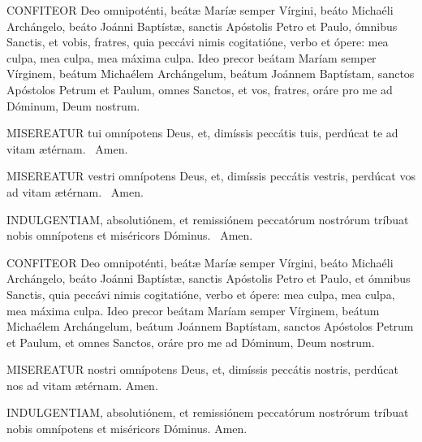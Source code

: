 
\lettrine[lines=2]{C}{ONFITEOR} Deo omnipoténti, beátæ Maríæ semper Vírgini, beáto Michaéli Archángelo, beáto Joánni Baptístæ, sanctis Apóstolis Petro et Paulo, ómnibus Sanctis, et vobis, fratres, quia peccávi nimis cogitatióne, verbo et ópere: mea culpa, mea culpa, mea máxima culpa. Ideo precor beátam Maríam semper Vírginem, beátum Michaélem Archángelum, beátum Joánnem Baptístam, sanctos Apóstolos Petrum et Paulum, omnes Sanctos, et vos, fratres, oráre pro me ad Dóminum, Deum nostrum.


\lettrine[lines=2]{M}{ISEREATUR} tui omnípotens Deus, et, dimíssis peccátis tuis, perdúcat te ad vitam ætérnam. \R\ Amen.



\lettrine[lines=2]{M}{ISEREATUR} vestri omnípotens Deus, et, dimíssis peccátis vestris, perdúcat vos ad vitam ætérnam. \R\ Amen.

\lettrine[lines=2]{I}{NDULGENTIAM}, absolutiónem, et remissiónem peccatórum nostrórum tríbuat nobis omnípotens et miséricors Dóminus. \R\ Amen.


\lettrine[lines=2]{C}{ONFITEOR} Deo omnipoténti, beátæ Maríæ semper Vírgini, beáto Michaéli Archángelo, beáto Joánni Baptístæ, sanctis Apóstolis Petro et Paulo, et ómnibus Sanctis, quia peccávi nimis cogitatióne, verbo et ópere: mea culpa, mea culpa, mea máxima culpa. Ideo precor beátam Maríam semper Vírginem, beátum Michaélem Archángelum, beátum Joánnem Baptístam, sanctos Apóstolos Petrum et Paulum, et omnes Sanctos, oráre pro me ad Dóminum, Deum nostrum.


\lettrine[lines=2]{M}{ISEREATUR} nostri omnípotens Deus, et, dimíssis peccátis nostris, perdúcat nos ad vitam ætérnam. Amen.

\lettrine[lines=2]{I}{NDULGENTIAM}, absolutiónem, et remissiónem peccatórum nostrórum tríbuat nobis omnípotens et miséricors Dóminus. Amen.


